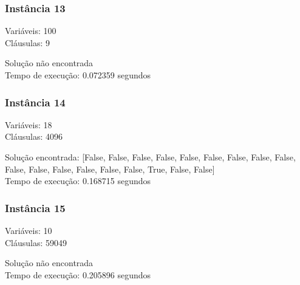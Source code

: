 \documentclass[12pt]{article}
\begin{document}
    \subsubsection{Instância 13}
        \begin{tcolorbox}[title=Entrada da instância 13, width=\linewidth, fontupper=\ttfamily,  halign=flush left]
            Variáveis: 100 \\
            Cláusulas: 9
        \end{tcolorbox}
        \begin{tcolorbox}[title=Saída da instância 13, width=\linewidth, fontupper=\ttfamily, halign=flush left]
            Solução não encontrada \\
            Tempo de execução: 0.072359 segundos
        \end{tcolorbox}
    \subsubsection{Instância 14}
        \begin{tcolorbox}[title=Entrada da instância 14, width=\linewidth, fontupper=\ttfamily,  halign=flush left]
            Variáveis: 18 \\
            Cláusulas: 4096
        \end{tcolorbox}
        \begin{tcolorbox}[title=Saída da instância 14, width=\linewidth, fontupper=\ttfamily, halign=flush left]
            Solução encontrada: [False, False, False, False, False, False, False, False, False, False, False, False, False, False, False, True, False, False] \\
            Tempo de execução: 0.168715 segundos
        \end{tcolorbox}
    \subsubsection{Instância 15}
        \begin{tcolorbox}[title=Entrada da instância 15, width=\linewidth, fontupper=\ttfamily,  halign=flush left]
            Variáveis: 10 \\
            Cláusulas: 59049
        \end{tcolorbox}
        \begin{tcolorbox}[title=Saída da instância 15, width=\linewidth, fontupper=\ttfamily, halign=flush left]
            Solução não encontrada \\
            Tempo de execução: 0.205896 segundos
        \end{tcolorbox}
\clearpage
\end{document}
